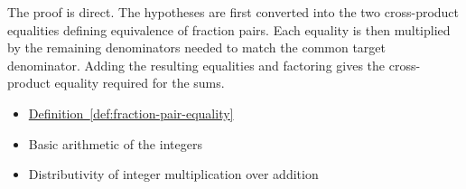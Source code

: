\begin{remark*}
The proof is direct. The hypotheses are first converted into the two
cross-product equalities defining equivalence of fraction pairs. Each
equality is then multiplied by the remaining denominators needed to
match the common target denominator. Adding the resulting equalities
and factoring gives the cross-product equality required for the sums.
\end{remark*}

\begin{dependencies}
\begin{itemize}
  \item \hyperref[def:fraction-pair-equality]{Definition~\ref*{def:fraction-pair-equality}}
  \item Basic arithmetic of the integers
  \item Distributivity of integer multiplication over addition
\end{itemize}
\end{dependencies}

\clearpage
